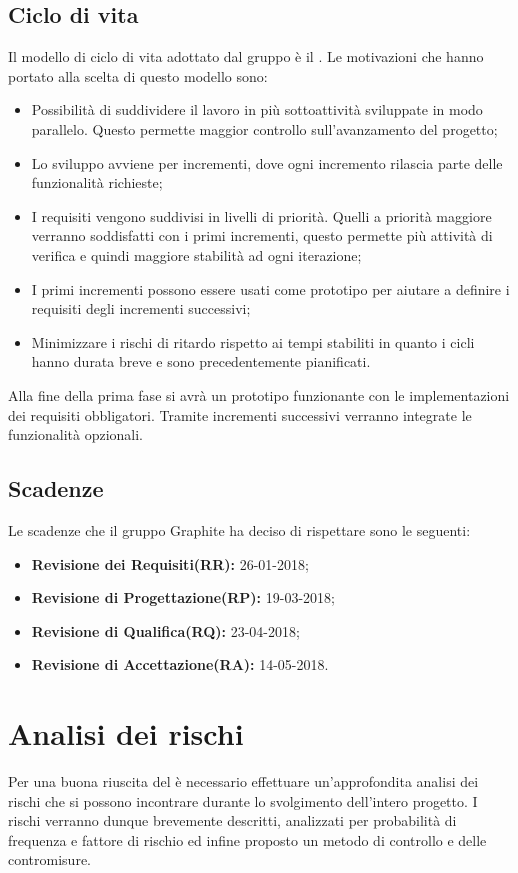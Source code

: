 \documentclass[./PianodiProgetto.tex]{subfiles}
\begin{document}
	\section{Ciclo di vita}
	
	Il modello di ciclo di vita adottato dal gruppo è il . Le motivazioni che hanno portato alla scelta di questo modello sono:
	\begin{itemize}
		\item Possibilità di suddividere il lavoro in più sottoattività sviluppate in modo parallelo. Questo permette maggior controllo sull’avanzamento del progetto;
		\item Lo sviluppo avviene per incrementi, dove ogni incremento rilascia parte delle funzionalità richieste;
		\item I requisiti vengono suddivisi in livelli di priorità. Quelli a priorità maggiore verranno soddisfatti con i primi incrementi, questo permette più attività di verifica e quindi maggiore stabilità ad ogni iterazione;
		\item I primi incrementi possono essere usati come prototipo per aiutare a definire i requisiti degli incrementi successivi;
		\item Minimizzare i rischi di ritardo rispetto ai tempi stabiliti in quanto i cicli hanno durata breve e sono precedentemente pianificati.
	\end{itemize}
	Alla fine della prima fase si avrà un prototipo funzionante con le implementazioni dei requisiti obbligatori. Tramite incrementi successivi verranno integrate le funzionalità opzionali.
	
	\section{Scadenze}
	Le scadenze che il gruppo Graphite ha deciso di rispettare sono le seguenti:
	\begin{itemize}
		\item \textbf{Revisione dei Requisiti(RR):} 26-01-2018;
		\item \textbf{Revisione di Progettazione(RP):} 19-03-2018;
		\item \textbf{Revisione di Qualifica(RQ):} 23-04-2018;
		\item \textbf{Revisione di Accettazione(RA):} 14-05-2018.
	\end{itemize}
	
	\chapter{Analisi dei rischi}
	Per una buona riuscita del  è necessario effettuare un'approfondita analisi dei rischi che si possono incontrare durante lo svolgimento dell'intero progetto. I rischi verranno dunque brevemente descritti, analizzati per probabilità di frequenza e fattore di rischio ed infine proposto un metodo di controllo e delle contromisure.
	
\end{document}
